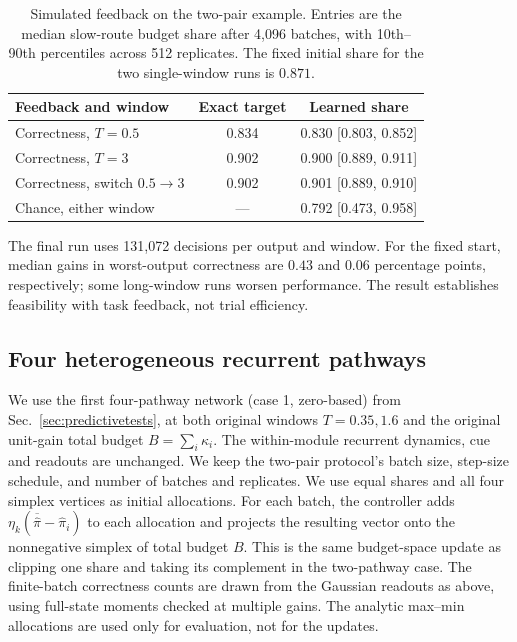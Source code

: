 \documentclass[aps,10pt,onecolumn,superscriptaddress,nofootinbib,
  longbibliography,amsmath,amssymb,floatfix]{revtex4-2}
\begin{document}
\begin{table}[!htbp]
\caption{\label{tab:feedback}Simulated feedback on the two-pair
example. Entries are the median slow-route budget share after
4,096 batches, with 10th--90th percentiles across 512 replicates.
The fixed initial share for the two single-window runs is \(0.871\).}
\begin{ruledtabular}
\begin{tabular}{lcc}
Feedback and window & Exact target & Learned share \\
\hline
Correctness, \(T=0.5\) & 0.834 & 0.830 [0.803, 0.852] \\
Correctness, \(T=3\) & 0.902 & 0.900 [0.889, 0.911] \\
Correctness, switch \(0.5\to3\) & 0.902 & 0.901 [0.889, 0.910] \\
Chance, either window & --- & 0.792 [0.473, 0.958] \\
\end{tabular}
\end{ruledtabular}
\end{table}

The final run uses 131,072 decisions per output and window.
For the fixed start, median gains in worst-output correctness
are \(0.43\) and \(0.06\) percentage points, respectively;
some long-window runs worsen performance. The result establishes
feasibility with task feedback, not trial efficiency.

\subsection{Four heterogeneous recurrent pathways}

We use the first four-pathway network (case 1, zero-based) from
Sec.~\ref{sec:predictivetests}, at both original windows
\(T=0.35,1.6\) and the original unit-gain total budget
\(B=\sum_i\kappa_i\). The within-module recurrent dynamics,
cue and readouts are unchanged. We keep the two-pair protocol's
batch size, step-size schedule, and number of batches and replicates.
We use equal shares and all four simplex vertices as initial
allocations. For each batch, the controller adds
\(\eta_k(\overline{\widehat\pi}-\widehat\pi_i)\) to each
allocation and projects the resulting vector onto the nonnegative
simplex of total budget \(B\). This is the same budget-space
update as clipping one share and taking its complement in the
two-pathway case. The finite-batch correctness counts are drawn
from the Gaussian readouts as above, using full-state moments
checked at multiple gains. The analytic max--min allocations are
used only for evaluation, not for the updates.
\end{document}
